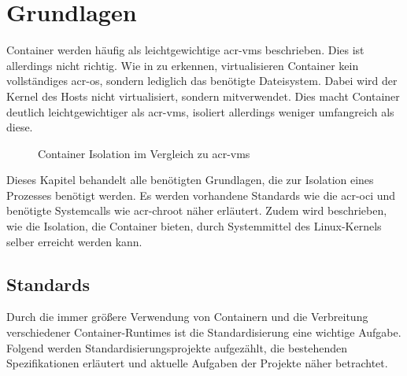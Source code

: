 \chapter{Grundlagen}
\label{chap:grundlagen}
Container werden häufig als leichtgewichtige \glspl{acr-vm} beschrieben. Dies ist allerdings nicht  richtig. Wie in  zu erkennen, virtualisieren Container kein vollständiges \gls{acr-os}, sondern lediglich das benötigte Dateisystem. Dabei wird der Kernel des Hosts nicht virtualisiert, sondern mitverwendet. Dies macht Container deutlich leichtgewichtiger als \glspl{acr-vm}, isoliert allerdings weniger umfangreich als diese.
\begin{figure}[h]
		\hfill
		\caption{Container Isolation im Vergleich zu \glspl{acr-vm}}
		\label{fig:containerVsVm}
\end{figure}

Dieses Kapitel behandelt alle benötigten Grundlagen, die zur Isolation eines Prozesses benötigt werden. Es werden vorhandene Standards wie die \gls{acr-oci} und benötigte Systemcalls wie \gls{acr-chroot} näher erläutert. Zudem wird beschrieben, wie die Isolation, die Container bieten, durch Systemmittel des Linux-Kernels selber erreicht werden kann.
\section{Standards}
\label{sec:standards}
Durch die immer größere Verwendung von Containern und die Verbreitung verschiedener Container-Runtimes ist die Standardisierung eine wichtige Aufgabe. Folgend werden Standardisierungsprojekte aufgezählt, die bestehenden Spezifikationen erläutert und aktuelle Aufgaben der Projekte näher betrachtet.
